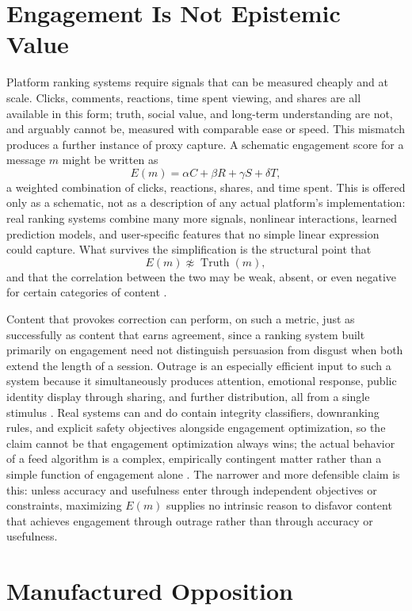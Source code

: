 \documentclass[11pt]{article}
\begin{document}
\section{Engagement Is Not Epistemic Value}

Platform ranking systems require signals that can be measured cheaply and at scale. Clicks, comments, reactions, time spent viewing, and shares are all available in this form; truth, social value, and long-term understanding are not, and arguably cannot be, measured with comparable ease or speed. This mismatch produces a further instance of proxy capture. A schematic engagement score for a message \(m\) might be written as
\[
E(m) = \alpha C + \beta R + \gamma S + \delta T,
\]
a weighted combination of clicks, reactions, shares, and time spent. This is offered only as a schematic, not as a description of any actual platform's implementation: real ranking systems combine many more signals, nonlinear interactions, learned prediction models, and user-specific features that no simple linear expression could capture. What survives the simplification is the structural point that
\[
E(m) \not\approx \operatorname{Truth}(m),
\]
and that the correlation between the two may be weak, absent, or even negative for certain categories of content \cite{vosoughi2018spread}.

Content that provokes correction can perform, on such a metric, just as successfully as content that earns agreement, since a ranking system built primarily on engagement need not distinguish persuasion from disgust when both extend the length of a session. Outrage is an especially efficient input to such a system because it simultaneously produces attention, emotional response, public identity display through sharing, and further distribution, all from a single stimulus \cite{mcloughlin2024outrage,rathje2021outgroup}. Real systems can and do contain integrity classifiers, downranking rules, and explicit safety objectives alongside engagement optimization, so the claim cannot be that engagement optimization always wins; the actual behavior of a feed algorithm is a complex, empirically contingent matter rather than a simple function of engagement alone \cite{guess2023algorithms}. The narrower and more defensible claim is this: unless accuracy and usefulness enter through independent objectives or constraints, maximizing \(E(m)\) supplies no intrinsic reason to disfavor content that achieves engagement through outrage rather than through accuracy or usefulness.

\section{Manufactured Opposition}
\end{document}

